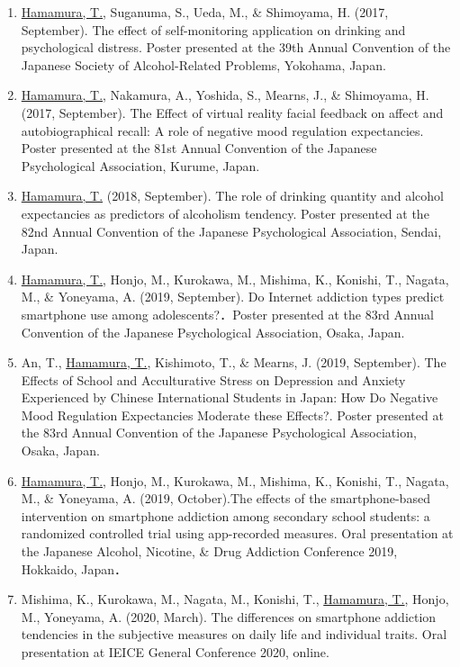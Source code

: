 \documentclass{article}
\begin{document}
\begin{enumerate}
	\item \underline{Hamamura, T.}, Suganuma, S., Ueda, M., \& Shimoyama, H. (2017, September). The effect of self-monitoring application on drinking and psychological distress. Poster presented at the 39th Annual Convention of the Japanese Society of Alcohol-Related Problems, Yokohama, Japan.
	\item \underline{Hamamura, T.}, Nakamura, A., Yoshida, S., Mearns, J., \& Shimoyama, H. (2017, September). The Effect of virtual reality facial feedback on affect and autobiographical recall: A role of negative mood regulation expectancies. Poster presented at the 81st Annual Convention of the Japanese Psychological Association, Kurume, Japan.
	\item \underline{Hamamura, T.} (2018, September). The role of drinking quantity and alcohol expectancies as predictors of alcoholism tendency. Poster presented at the 82nd Annual Convention of the Japanese Psychological Association, Sendai, Japan.
	\item \underline{Hamamura, T.}, Honjo, M., Kurokawa, M., Mishima, K., Konishi, T., Nagata, M., \& Yoneyama, A. (2019, September). Do Internet addiction types predict smartphone use among adolescents?．Poster presented at the 83rd Annual Convention of the Japanese Psychological Association, Osaka, Japan.
	\item An, T., \underline{Hamamura, T.}, Kishimoto, T., \& Mearns, J. (2019, September). The Effects of School and Acculturative Stress on Depression and Anxiety Experienced by Chinese International Students in Japan: How Do Negative Mood Regulation Expectancies Moderate these Effects?. Poster presented at the 83rd Annual Convention of the Japanese Psychological Association, Osaka, Japan.
	\item \underline{Hamamura, T.}, Honjo, M., Kurokawa, M., Mishima, K., Konishi, T., Nagata, M., \& Yoneyama, A. (2019, October).The effects of the smartphone-based intervention on smartphone addiction among secondary school students: a randomized controlled trial using app-recorded measures. Oral presentation at the Japanese Alcohol, Nicotine, \& Drug Addiction Conference 2019, Hokkaido, Japan．
	\item Mishima, K., Kurokawa, M., Nagata, M., Konishi, T., \underline{Hamamura, T.}, Honjo, M., Yoneyama, A. (2020, March). The differences on smartphone addiction tendencies in the subjective measures on daily life and individual traits. Oral presentation at IEICE General Conference 2020, online.

\end{enumerate}
\end{document}
